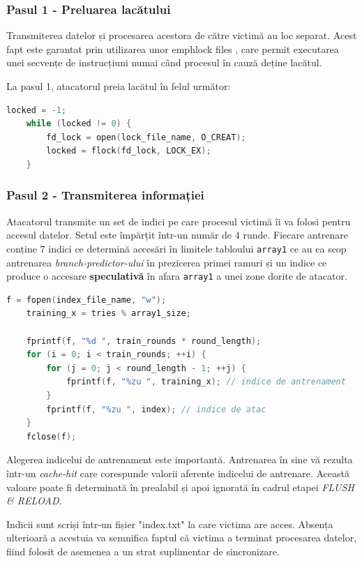 \subsubsection{Pasul 1 - Preluarea lacătului}

Transmiterea datelor și procesarea acestora de către victimă au loc separat. 
Acest fapt este garantat prin utilizarea unor emph{lock files} \cite{file_locks},
care permit executarea unei secvențe de instrucțiuni numai când procesul în cauză
deține lacătul.

La pasul 1, atacatorul preia lacătul în felul următor:

\begin{lstlisting}[language=c, caption=Preluarea lacătului]
	locked = -1;
	while (locked != 0) {
		fd_lock = open(lock_file_name, O_CREAT);
		locked = flock(fd_lock, LOCK_EX);
	}
\end{lstlisting}

\subsubsection{Pasul 2 - Transmiterea informației}

Atacatorul transmite un set de indici pe care procesul victimă îi va folosi
pentru accesul datelor. Setul este împărțit într-un număr de $4$ runde. Fiecare
antrenare conține $7$ indici ce determină accesări în limitele tabloului
\texttt{array1} ce au ca scop antrenarea \emph{branch-predictor-ului} în
prezicerea primei ramuri și un indice ce produce o accesare \textbf{speculativă}
în afara \texttt{array1} a unei zone dorite de atacator.

\begin{lstlisting}[language=c, caption=Transmiterea datelor]
	f = fopen(index_file_name, "w");
	training_x = tries % array1_size;

	fprintf(f, "%d ", train_rounds * round_length);
	for (i = 0; i < train_rounds; ++i) {
		for (j = 0; j < round_length - 1; ++j) {
			fprintf(f, "%zu ", training_x); // indice de antrenament
		}
		fprintf(f, "%zu ", index); // indice de atac
	}
	fclose(f);
\end{lstlisting}

Alegerea indicelui de antrenament este importantă. Antrenarea în sine vă rezulta
într-un \emph{cache-hit} care corespunde valorii aferente indicelui de antrenare.
Această valoare poate fi determinată în prealabil și apoi ignorată în cadrul
etapei \emph{FLUSH \& RELOAD}.
	
Indicii sunt scriși într-un fișier "index.txt" la care victima are acces. Absența
ulterioară a acestuia va semnifica faptul că victima a terminat procesarea
datelor, fiind folosit de asemenea a un strat suplimentar de sincronizare.

